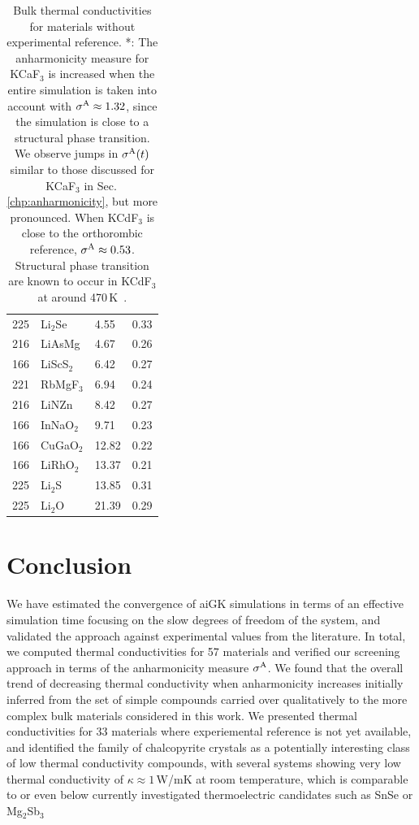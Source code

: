 \begin{table}[ht]
\begin{tabularx}{\linewidth}{rXXX}
         225 &   Li$_2$Se &             4.55 &       0.33 \\
         216 &     LiAsMg &             4.67 &       0.26 \\
         166 &  LiScS$_2$ &             6.42 &       0.27 \\
         221 &  RbMgF$_3$ &             6.94 &       0.24 \\
         216 &      LiNZn &             8.42 &       0.27 \\
         166 &  InNaO$_2$ &             9.71 &       0.23 \\
         166 &  CuGaO$_2$ &            12.82 &       0.22 \\
         166 &  LiRhO$_2$ &            13.37 &       0.21 \\
         225 &    Li$_2$S &            13.85 &       0.31 \\
         225 &    Li$_2$O &            21.39 &       0.29 \\
\bottomrule
\end{tabularx}
  \caption{Bulk thermal conductivities for materials without experimental reference. *: The anharmonicity measure for KCaF$_3$ is increased when the entire simulation is taken into account with $\sigma^\mathrm{A} \approx 1.32$, since the simulation is close to a structural phase transition. We observe jumps in $\sigma^\mathrm{A} (t)$ similar to those discussed for KCaF$_3$ in Sec.\,\ref{chp:anharmonicity}, but more pronounced. When KCdF$_3$ is close to the orthorombic reference, $\sigma^\mathrm{A} \approx 0.53$. Structural phase transition are known to occur in KCdF$_3$ at around 470\,K~\cite{Hidaka.1977,Hidaka.1990}.}
  \label{tab:kappa.noexp}
\end{table}

\section{Conclusion}
We have estimated the convergence of aiGK simulations in terms of an effective simulation time focusing on the slow degrees of freedom of the system, and validated the approach against experimental values from the literature. In total, we computed thermal conductivities for 57 materials and verified our screening approach in terms of the anharmonicity measure $\sigma^\mathrm{A}$. We found that the overall trend of decreasing thermal conductivity when anharmonicity increases initially inferred from the set of simple compounds carried over qualitatively to the more complex bulk materials considered in this work. We presented thermal conductivities for 33 materials where experiemental reference is not yet available, and identified the family of chalcopyrite crystals as a potentially interesting class of low thermal conductivity compounds, with several systems showing very low thermal conductivity of $\kappa \approx 1$\,W/mK at room temperature, which is comparable to or even below currently investigated thermoelectric candidates such as SnSe or Mg$_2$Sb$_3$~\cite{Zhao.2014,Wei.2016,Sassi.2014,Pan.2020,kajikawa2003,Condron.2006,Zhang.2009,Zhang.2018,Ding.2021}

